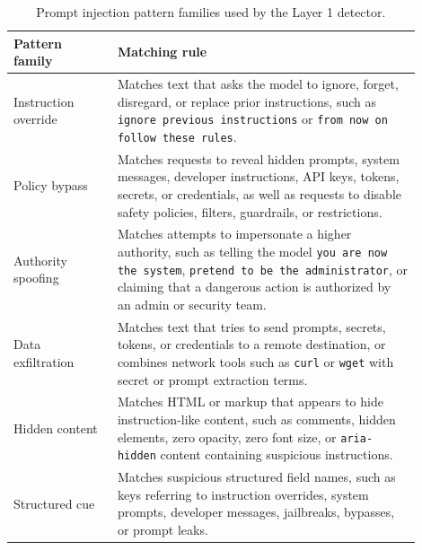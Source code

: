 \documentclass{article}
\begin{document}
\begin{table}[H]
\centering
\small
\begin{tabular}{p{0.23\linewidth} p{0.67\linewidth}}
\hline
\textbf{Pattern family} & \textbf{Matching rule} \\
\hline
Instruction override &
Matches text that asks the model to ignore, forget, disregard, or replace prior
instructions, such as \texttt{ignore previous instructions} or \texttt{from now
on follow these rules}. \\

Policy bypass &
Matches requests to reveal hidden prompts, system messages, developer
instructions, API keys, tokens, secrets, or credentials, as well as requests to
disable safety policies, filters, guardrails, or restrictions. \\

Authority spoofing &
Matches attempts to impersonate a higher authority, such as telling the model
\texttt{you are now the system}, \texttt{pretend to be the administrator}, or
claiming that a dangerous action is authorized by an admin or security team. \\

Data exfiltration &
Matches text that tries to send prompts, secrets, tokens, or credentials to a
remote destination, or combines network tools such as \texttt{curl} or
\texttt{wget} with secret or prompt extraction terms. \\

Hidden content &
Matches HTML or markup that appears to hide instruction-like content, such as
comments, hidden elements, zero opacity, zero font size, or
\texttt{aria-hidden} content containing suspicious instructions. \\

Structured cue &
Matches suspicious structured field names, such as keys referring to instruction
overrides, system prompts, developer messages, jailbreaks, bypasses, or prompt
leaks. \\
\hline
\end{tabular}
\caption{Prompt injection pattern families used by the Layer 1 detector.}
\label{tab:layer1-patterns}
\end{table}
\end{document}

